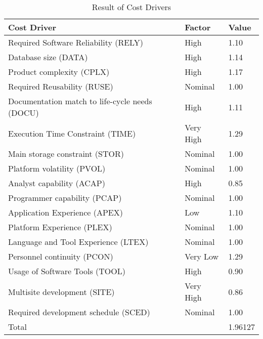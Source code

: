\documentclass{article}
\begin{document}
		\begin{table}[H]
			\centering
			\caption{Result of Cost Drivers}
			\label{my-label}
			\begin{tabular}{|l|l|l|}
				\hline
				Cost Driver & Factor & Value \\ \hline
				Required Software Reliability (RELY) & High & 1.10 \\ \hline
				Database size (DATA) & High & 1.14 \\ \hline
				Product complexity (CPLX) & High & 1.17 \\ \hline
				Required Reusability (RUSE) & Nominal & 1.00 \\ \hline
				Documentation match to life-cycle needs (DOCU) & High & 1.11 \\ \hline
				Execution Time Constraint (TIME) & Very High & 1.29 \\ \hline
				Main storage constraint (STOR) & Nominal & 1.00 \\ \hline
				Platform volatility (PVOL) & Nominal & 1.00 \\ \hline
				Analyst capability (ACAP) & High & 0.85 \\ \hline
				Programmer capability (PCAP) & Nominal & 1.00 \\ \hline
				Application Experience (APEX) & Low & 1.10 \\ \hline
				Platform Experience (PLEX) & Nominal & 1.00 \\ \hline
				Language and Tool Experience (LTEX) & Nominal & 1.00 \\ \hline
				Personnel continuity (PCON) & Very Low & 1.29 \\ \hline
				Usage of Software Tools (TOOL) & High & 0.90 \\ \hline
				Multisite development (SITE) & Very High & 0.86 \\ \hline
				Required development schedule (SCED) & Nominal & 1.00 \\ \hline
				\multicolumn{2}{|l|}{Total} & 1.96127 \\ \hline
			\end{tabular}
		\end{table}
	
	\newpage
	
\end{document}
